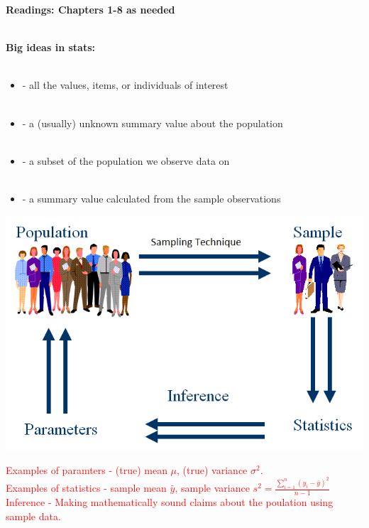\begin{center}\large\textbf{Readings: Chapters 1-8 as needed}\\
\normalsize \end{center}
\large ~\hrulefill
~\\\noindent \textbf{Big ideas in stats:}\normalsize\\~\\
\begin{itemize}
\item \textcolor{red}{} - all the values, items, or individuals of interest\\~\\

\item \textcolor{red}{}  - a (usually) unknown summary value about the population\\~\\

\item \textcolor{red}{} - a subset of the population we observe data on\\~\\

\item \textcolor{red}{} - a summary value calculated from the sample observations
\end{itemize}

\begin{center}
\includegraphics[scale=0.4]{paradigm}
\end{center}
\textcolor{red}{Examples of paramters - (true) mean $\mu$, (true) variance $\sigma^2$.\\
Examples of statistics - sample mean $\bar{y}$, sample variance $s^2=\frac{\sum_{i=1}^{n}(y_i-\bar{y})^2}{n-1}$\\
Inference - Making mathematically sound claims about the poulation using sample data.}


